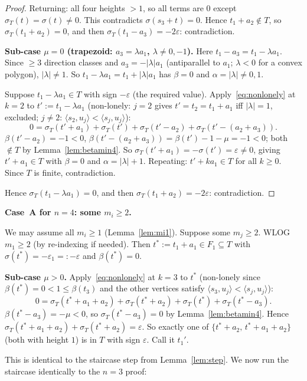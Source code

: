 \documentclass{article}
\begin{document}
\begin{proof}
Returning: all four heights $>1$, so all terms are $0$ except $\sigma_T(t)=\sigma(t)\ne 0$.
This contradicts $\sigma(s_3+t)=0$.
Hence $t_1+a_2\notin T$, so $\sigma_T(t_1+a_2)=0$, and then $\sigma_T(t_1-a_3)=-2\varepsilon$:
contradiction.

\medskip
\noindent\textbf{Sub-case $\mu=0$ (trapezoid: $a_3=\lambda a_1$, $\lambda\ne 0,-1$).}
Here $t_1-a_3=t_1-\lambda a_1$.  Since $\ge 3$ direction classes and $a_3=-|\lambda|a_1$
(antiparallel to $a_1$; $\lambda<0$ for a convex polygon), $|\lambda|\ne 1$.
So $t_1-\lambda a_1=t_1+|\lambda|a_1$ has $\beta=0$ and $\alpha=|\lambda|\ne 0,1$.

Suppose $t_1-\lambda a_1\in T$ with sign $-\varepsilon$ (the required value).
Apply~\eqref{eq:nonlonely} at $k=2$ to $t':=t_1-\lambda a_1$
(non-lonely: $j=2$ gives $t'=t_2=t_1+a_1$ iff $|\lambda|=1$, excluded;
$j\ne 2$: $\langle s_2,u_j\rangle<\langle s_j,u_j\rangle$):
\[
  0=\sigma_T(t'+a_1)+\sigma_T(t')+\sigma_T(t'-a_2)+\sigma_T(t'-(a_2+a_3)).
\]
$\beta(t'-a_2)=-1<0$, $\beta(t'-(a_2+a_3))=\beta(t')-1-\mu=-1<0$; both $\notin T$
by Lemma~\ref{lem:betamin4}.
So $\sigma_T(t'+a_1)=-\sigma(t')=\varepsilon\ne 0$, giving $t'+a_1\in T$
with $\beta=0$ and $\alpha=|\lambda|+1$.
Repeating: $t'+ka_1\in T$ for all $k\ge 0$.  Since $T$ is finite, contradiction.

Hence $\sigma_T(t_1-\lambda a_1)=0$, and then $\sigma_T(t_1+a_2)=-2\varepsilon$:
contradiction.
\end{proof}

\medskip
\noindent\textbf{Case~A for $n=4$: some $m_i\ge 2$.}

We may assume all $m_i\ge 1$ (Lemma~\ref{lem:mi1}).  Suppose some $m_j\ge 2$.
WLOG $m_1\ge 2$ (by re-indexing if needed).  Then $t^*:=t_1+a_1\in F_1\subseteq T$
with $\sigma(t^*)=-\varepsilon_1=:-\varepsilon$ and $\beta(t^*)=0$.

\medskip
\noindent\textbf{Sub-case $\mu>0$.}
Apply~\eqref{eq:nonlonely} at $k=3$ to $t^*$ (non-lonely since $\beta(t^*)=0<1\le\beta(t_3)$
and the other vertices satisfy $\langle s_3,u_j\rangle<\langle s_j,u_j\rangle$):
\[
  0=\sigma_T(t^*+a_1+a_2)+\sigma_T(t^*+a_2)+\sigma_T(t^*)+\sigma_T(t^*-a_3).
\]
$\beta(t^*-a_3)=-\mu<0$, so $\sigma_T(t^*-a_3)=0$ by Lemma~\ref{lem:betamin4}.
Hence $\sigma_T(t^*+a_1+a_2)+\sigma_T(t^*+a_2)=\varepsilon$.
So exactly one of $\{t^*+a_2,\,t^*+a_1+a_2\}$ (both with height $1$) is in $T$
with sign $\varepsilon$.  Call it $t_1'$.

This is identical to the staircase step from Lemma~\ref{lem:step}.  We now run the
staircase identically to the $n=3$ proof:
\end{document}
